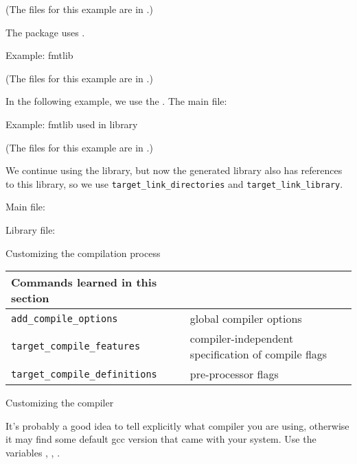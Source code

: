 (The files for this example are in .)

The  package uses .




 {Example: fmtlib}

(The files for this example are in .)

In the following example, we use the .
The main  file:
%


 {Example: fmtlib used in library}

(The files for this example are in .)

We continue using the  library,
but now the generated library also has references to this library,
so we use \lstinline+target_link_directories+ and \lstinline+target_link_library+.

Main file:
%


Library file:
%



 {Customizing the compilation process}

\begin{tabular}{lp{3in}}
  \toprule
  Commands learned in this section\\
  \midrule
  \lstinline+add_compile_options+&global compiler options\\
  \lstinline+target_compile_features+&compiler-independent specification of compile flags\\
  \lstinline+target_compile_definitions+&pre-processor flags\\
  \bottomrule
\end{tabular}

 {Customizing the compiler}

It's probably a good idea to tell  explicitly what compiler you are using,
otherwise it may find some default gcc version that came with your system.
Use the variables , ,
.

